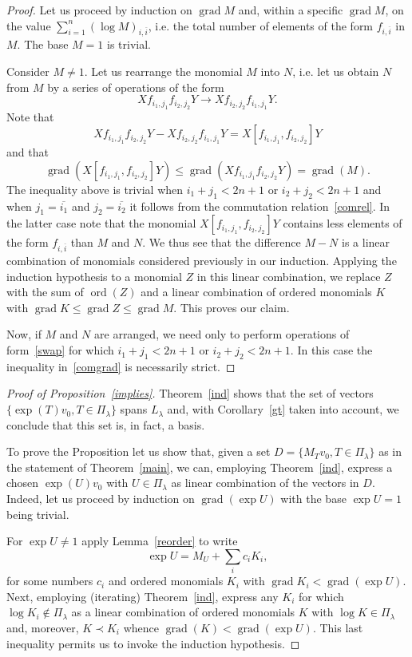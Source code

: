 \documentclass[10pt,a4paper]{article}
\theoremstyle{remark}\newtheorem{rema}[theo]{Remark}
\DeclareMathOperator{\ord}{ord}
\DeclareMathOperator{\grad}{grad}
\newcommand{\la}{\lambda}
\begin{document}
\begin{proof}
Let us proceed by induction on $\grad M$ and, within a specific $\grad M$, on the value $\sum_{i=1}^n (\log M)_{i,\overline i}$, i.e. the total number of elements of the form $f_{i,\overline i}$ in $M$. The base $M=1$ is trivial.

Consider $M\neq 1$. Let us rearrange the monomial $M$ into $N$, i.e. let us obtain $N$ from $M$ by a series of operations of the form
\begin{equation}\label{swap}
Xf_{i_1,j_1}f_{i_2,j_2}Y\rightarrow Xf_{i_2,j_2}f_{i_1,j_1}Y.
\end{equation}
Note that
\[
Xf_{i_1,j_1}f_{i_2,j_2}Y-Xf_{i_2,j_2}f_{i_1,j_1}Y=X[f_{i_1,j_1},f_{i_2,j_2}]Y
\]
and that
\begin{equation}\label{comgrad}
\grad(X[f_{i_1,j_1},f_{i_2,j_2}]Y)\le\grad(Xf_{i_1,j_1}f_{i_2,j_2}Y)=\grad(M).
\end{equation}
The inequality above is trivial when $i_1+j_1<2n+1$ or $i_2+j_2<2n+1$ and when $j_1=\overline{i_1}$ and $j_2=\overline{i_2}$ it follows from the commutation relation~\eqref{comrel}. In the latter case note that the monomial $X[f_{i_1,j_1},f_{i_2,j_2}]Y$ contains less elements of the form $f_{i,\overline i}$ than $M$ and $N$. We thus see that the difference $M-N$ is a linear combination of monomials considered previously in our induction. Applying the induction hypothesis to a monomial $Z$ in this linear combination, we replace $Z$ with the sum of $\ord(Z)$ and a linear combination of ordered monomials $K$ with $\grad K\le\grad Z\le\grad M$. This proves our claim.

Now, if $M$ and $N$ are arranged, we need only to perform operations of form~\eqref{swap} for which $i_1+j_1<2n+1$ or $i_2+j_2<2n+1$. In this case the inequality in~\eqref{comgrad} is necessarily strict.
\end{proof}

\begin{proof}[Proof of Proposition~\ref{implies}]
Theorem~\ref{ind} shows that the set of vectors $\{\exp(T)v_0,T\in\Pi_\lambda\}$ spans $L_\la$ and, with Corollary~\ref{gt} taken into account, we conclude that this set is, in fact, a basis.

To prove the Proposition let us show that, given a set $D=\{M_T v_0,T\in\Pi_\la\}$ as in the statement of Theorem~\ref{main}, we can, employing Theorem~\ref{ind}, express a chosen $\exp(U) v_0$ with $U\in\Pi_\la$ as linear combination of the vectors in $D$. Indeed, let us proceed by induction on $\grad(\exp U)$ with the base $\exp U=1$ being trivial.

For $\exp U\neq 1$ apply Lemma~\ref{reorder} to write
\[
\exp U=M_U+\sum_i c_i K_i,
\]
for some numbers $c_i$ and ordered monomials $K_i$ with $\grad K_i<\grad(\exp U)$. Next, employing (iterating) Theorem~\ref{ind}, express any $K_i$ for which $\log K_i\notin\Pi_\lambda$ as a linear combination of ordered monomials $K$ with $\log K\in\Pi_\lambda$ and, moreover, $K\prec K_i$ whence $\grad(K)<\grad(\exp U)$. This last inequality permits us to invoke the induction hypothesis.
\end{proof}
\end{document}
